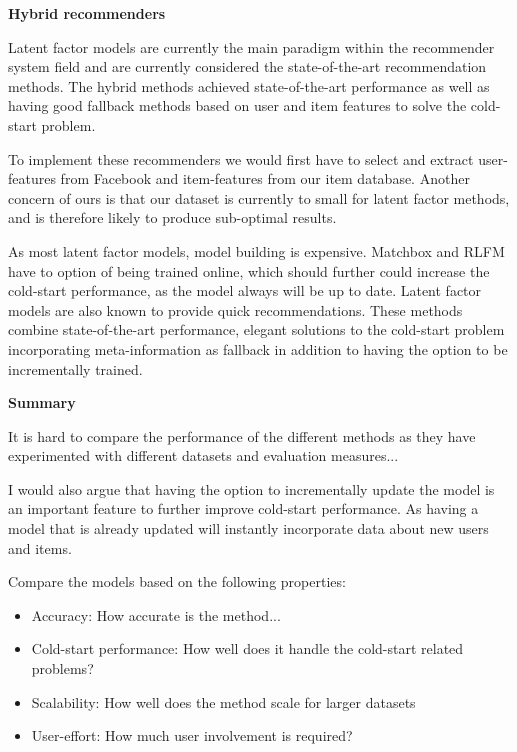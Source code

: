 \textbf{Hybrid recommenders}


Latent factor models are currently the main paradigm within the recommender system field and are currently considered the state-of-the-art recommendation methods. The hybrid methods achieved state-of-the-art performance as well as having good fallback methods based on user and item features to solve the cold-start problem.

To implement these recommenders we would first have to select and extract user-features from Facebook and item-features from our item database. Another concern of ours is that our dataset is currently to small for latent factor methods, and is therefore likely to produce sub-optimal results.

As most latent factor models, model building is expensive. Matchbox and RLFM have to option of being trained online, which should further could increase the cold-start performance, as the model always will be up to date. Latent factor models are also known to provide quick recommendations. These methods combine state-of-the-art performance, elegant solutions to the cold-start problem incorporating meta-information as fallback in addition to having the option to be incrementally trained.\newline


\textbf{Summary}



It is hard to compare the performance of the different methods as they have experimented with different datasets and evaluation measures...

I would also argue that having the option to incrementally update the model is an important feature to further improve cold-start performance. As having a model that is already updated will instantly incorporate data about new users and items.

Compare the models based on the following properties:

\begin{itemize}
	\item Accuracy: How accurate is the method...
	\item Cold-start performance: How well does it handle the cold-start related problems?
	\item Scalability: How well does the method scale for larger datasets
	\item User-effort: How much user involvement is required?
\end{itemize}

